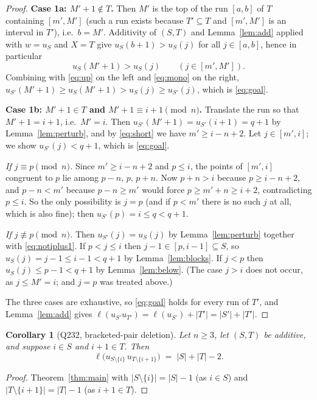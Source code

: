 \documentclass[11pt]{article}
\newtheorem{cor}[thm]{Corollary}
\theoremstyle{definition}
\begin{document}
\begin{proof}
\medskip
\noindent\textbf{Case 1a: $M'+1\notin T$.}
Then $M'$ is the top of the run $[a,b]$ of $T$ containing $[m',M']$ (such a run exists because
$T'\subseteq T$ and $[m',M']$ is an interval in $T'$), i.e.\ $b=M'$. Additivity of $(S,T)$ and
Lemma~\ref{lem:add} applied with $w=u_S$ and $X=T$ give $u_S(b+1)>u_S(j)$ for all $j\in[a,b]$,
hence in particular
\[
  u_S(M'+1)>u_S(j)\qquad (j\in[m',M']).
\]
Combining with \eqref{eq:up} on the left and \eqref{eq:mono} on the right,
$u_{S'}(M'+1)\ge u_S(M'+1)>u_S(j)\ge u_{S'}(j)$, which is \eqref{eq:goal}.

\medskip
\noindent\textbf{Case 1b: $M'+1\in T$ and $M'+1\equiv i+1\pmod n$.}
Translate the run so that $M'+1=i+1$, i.e.\ $M'=i$. Then $u_{S'}(M'+1)=u_{S'}(i+1)=q+1$ by
Lemma~\ref{lem:perturb}, and by \eqref{eq:short} we have $m'\ge i-n+2$. Let $j\in[m',i]$; we
show $u_{S'}(j)<q+1$, which is \eqref{eq:goal}.

\emph{If $j\equiv p\pmod n$.} Since $m'\ge i-n+2$ and $p\le i$, the points of $[m',i]$ congruent
to $p$ lie among $p-n,\,p,\,p+n$. Now $p+n>i$ because $p\ge i-n+2$, and $p-n<m'$ because
$p-n\ge m'$ would force $p\ge m'+n\ge i+2$, contradicting $p\le i$. So the only possibility is
$j=p$ (and if $p<m'$ there is no such $j$ at all, which is also fine); then
$u_{S'}(p)=i\le q<q+1$.

\emph{If $j\not\equiv p\pmod n$.} Then $u_{S'}(j)=u_S(j)$ by Lemma~\ref{lem:perturb} together
with \eqref{eq:notiplus1}. If $p<j\le i$ then $j-1\in[p,i-1]\subseteq S$, so $u_S(j)=j-1\le
i-1<q+1$ by Lemma~\ref{lem:blocks}. If $j<p$ then $u_S(j)\le p-1<q+1$ by
Lemma~\ref{lem:below}. (The case $j>i$ does not occur, as $j\le M'=i$; and $j=p$ was treated
above.)

\medskip
The three cases are exhaustive, so \eqref{eq:goal} holds for every run of $T'$, and
Lemma~\ref{lem:add} gives $\ell(u_{S'}u_{T'})=\ell(u_{S'})+|T'|=|S'|+|T'|$.
\end{proof}

\begin{cor}[Q232, bracketed-pair deletion]\label{cor:q232}
Let $n\ge3$, let $(S,T)$ be additive, and suppose $i\in S$ and $i+1\in T$. Then
\[
  \ell\bigl(u_{S\setminus\{i\}}\,u_{T\setminus\{i+1\}}\bigr)\;=\;|S|+|T|-2 .
\]
\end{cor}

\begin{proof}
Theorem~\ref{thm:main} with $|S\setminus\{i\}|=|S|-1$ (as $i\in S$) and
$|T\setminus\{i+1\}|=|T|-1$ (as $i+1\in T$).
\end{proof}
\end{document}
